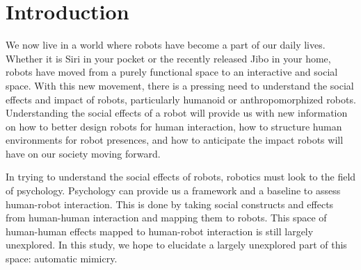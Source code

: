 \documentclass{acm_proc_article-sp}
\begin{document}
\maketitle
\begin{abstract}
This paper provides a sample of a \LaTeX\ document which conforms to
the formatting guidelines for ACM SIG Proceedings.
It complements the document \textit{Author's Guide to Preparing
ACM SIG Proceedings Using \LaTeX$2_\epsilon$\ and Bib\TeX}. This
source file has been written with the intention of being
compiled under \LaTeX$2_\epsilon$\ and BibTeX.

The developers have tried to include every imaginable sort
of ``bells and whistles", such as a subtitle, footnotes on
title, subtitle and authors, as well as in the text, and
every optional component (e.g. Acknowledgments, Additional
Authors, Appendices), not to mention examples of
equations, theorems, tables and figures.

To make best use of this sample document, run it through \LaTeX\
and BibTeX, and compare this source code with the printed
output produced by the dvi file.
\end{abstract}


\section{Introduction}
We now live in a world where robots have become a part of our daily lives. Whether it is Siri in your pocket or the recently released Jibo in your home, robots have moved from a purely functional space to an interactive and social space. With this new movement, there is a pressing need to understand the social effects and impact of robots, particularly humanoid or anthropomorphized robots. Understanding the social effects of a robot will provide us with new information on how to better design robots for human interaction, how to structure human environments for robot presences, and how to anticipate the impact robots will have on our society moving forward. 

In trying to understand the social effects of robots, robotics must look to the field of psychology. Psychology can provide us a framework and a baseline to assess human-robot interaction. This is done by taking social constructs and effects from human-human interaction and mapping them to robots. This space of human-human effects mapped to human-robot interaction is still largely unexplored. In this study, we hope to elucidate a largely unexplored part of this space: automatic mimicry.
\end{document}
